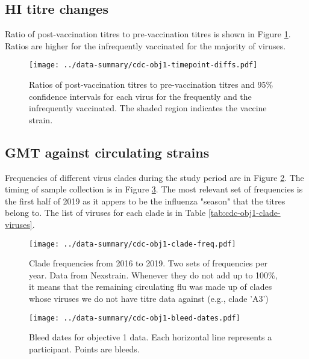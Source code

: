 \documentclass[12pt]{article}
\begin{document}
\subsection{HI titre changes}

Ratio of post-vaccination titres to pre-vaccination titres is shown in Figure
\ref{fig:cdc-obj1-timepoint-diffs}. Ratios are higher for the infrequently
vaccinated for the majority of viruses.

\begin{figure}
	\texttt{[image: ../data-summary/cdc-obj1-timepoint-diffs.pdf]}
	\caption{Ratios of post-vaccination titres to pre-vaccination titres and 95\% confidence intervals for each virus for the frequently and the infrequently vaccinated. The shaded region indicates the vaccine strain.}
	\label{fig:cdc-obj1-timepoint-diffs}
\end{figure}

\subsection{GMT against circulating strains}

Frequencies of different virus clades during the study period are in Figure \ref{fig:cdc-obj1-clade-freq}. The timing of sample collection is in Figure \ref{fig:cdc-obj1-bleed-dates}. The most relevant set of frequencies is the first half of 2019 as it appers to be the influenza "season" that the titres belong to. The list of viruses for each clade is in Table \ref{tab:cdc-obj1-clade-viruses}.

\begin{figure}
	\texttt{[image: ../data-summary/cdc-obj1-clade-freq.pdf]}
	\caption{Clade frequencies from 2016 to 2019. Two sets of frequencies per year. Data from Nexstrain. Whenever they do not add up to 100\%, it means that the remaining circulating flu was made up of clades whose viruses we do not have titre data against (e.g., clade 'A3')}
	\label{fig:cdc-obj1-clade-freq}
\end{figure}

\begin{figure}
	\texttt{[image: ../data-summary/cdc-obj1-bleed-dates.pdf]}
	\caption{Bleed dates for objective 1 data. Each horizontal line represents a participant. Points are bleeds.}
	\label{fig:cdc-obj1-bleed-dates}
\end{figure}
\end{document}
